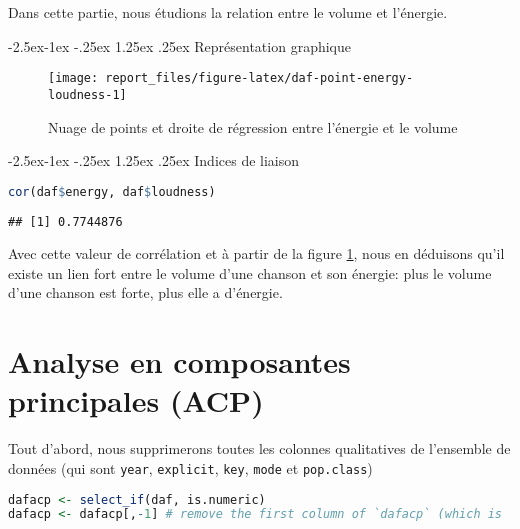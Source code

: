 \documentclass[
  11pt,
  xcolor = usenames,dvipsnames]{article}
\makeatletter
\newcommand{\passthrough}[1]{#1}
\renewcommand\paragraph{\@startsection{paragraph}{4}{\z@}%
        {-2.5ex\@plus -1ex \@minus -.25ex}%
        {1.25ex \@plus .25ex}%
        {\normalfont\normalsize\bfseries}}
\makeatother
\begin{document}
Dans cette partie, nous étudions la relation entre le volume et l'énergie.

\hypertarget{repruxe9sentation-graphique-1}{%
\paragraph{Représentation graphique}\label{repruxe9sentation-graphique-1}}

\begin{figure}

{\centering \texttt{[image: report\_files/figure-latex/daf-point-energy-loudness-1]} 

}

\caption{Nuage de points et droite de régression entre l'énergie et le volume}\label{fig:daf-point-energy-loudness}
\end{figure}

\hypertarget{indices-de-liaison}{%
\paragraph{Indices de liaison}\label{indices-de-liaison}}

\begin{lstlisting}[language=R]
cor(daf$energy, daf$loudness)
\end{lstlisting}

\begin{lstlisting}
## [1] 0.7744876
\end{lstlisting}

Avec cette valeur de corrélation et à partir de la figure \ref{fig:daf-point-energy-loudness},
nous en déduisons qu'il existe un lien fort entre le volume d'une chanson et son énergie:
plus le volume d'une chanson est forte, plus elle a d'énergie.

\hypertarget{analyse-en-composantes-principales-acp}{%
\section{Analyse en composantes principales (ACP)}\label{analyse-en-composantes-principales-acp}}

Tout d'abord, nous supprimerons toutes les colonnes qualitatives de
l'ensemble de données (qui sont \passthrough{\lstinline!year!}, \passthrough{\lstinline!explicit!}, \passthrough{\lstinline!key!}, \passthrough{\lstinline!mode!} et \passthrough{\lstinline!pop.class!})

\begin{lstlisting}[language=R]
dafacp <- select_if(daf, is.numeric)
dafacp <- dafacp[,-1] # remove the first column of `dafacp` (which is `year`)
\end{lstlisting}
\end{document}
